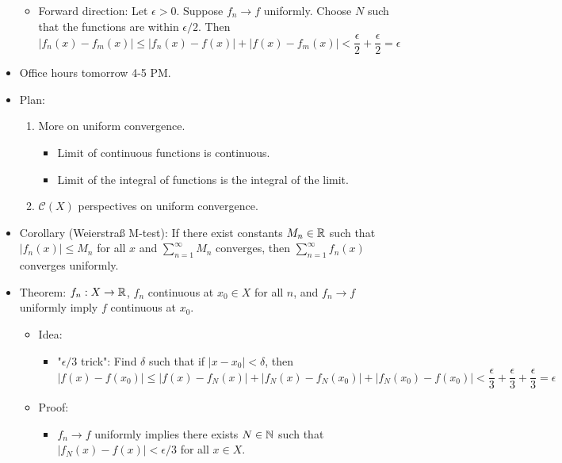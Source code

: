 \documentclass[../notes.tex]{subfiles}
\begin{document}
\begin{itemize}
    \begin{itemize}
        \item Forward direction: Let $\epsilon>0$. Suppose $f_n\to f$ uniformly. Choose $N$ such that the functions are within $\epsilon/2$. Then
        \begin{equation*}
            |f_n(x)-f_m(x)| \leq |f_n(x)-f(x)|+|f(x)-f_m(x)| < \frac{\epsilon}{2}+\frac{\epsilon}{2} = \epsilon
        \end{equation*}
    \end{itemize}
    \item {}Office hours tomorrow 4-5 PM.
    \item Plan:
    \begin{enumerate}
        \item More on uniform convergence.
        \begin{itemize}
            \item Limit of continuous functions is continuous.
            \item Limit of the integral of functions is the integral of the limit.
        \end{itemize}
        \item $\mathcal{C}(X)$ perspectives on uniform convergence.
    \end{enumerate}
    \item Corollary (Weierstra{\ss} M-test): If there exist constants $M_n\in\mathbb{R}$ such that $|f_n(x)|\leq M_n$ for all $x$ and $\sum_{n=1}^\infty M_n$ converges, then $\sum_{n=1}^\infty f_n(x)$ converges uniformly.
    \item Theorem: $f_n:X\to\mathbb{R}$, $f_n$ continuous at $x_0\in X$ for all $n$, and $f_n\to f$ uniformly imply $f$ continuous at $x_0$.
    \begin{itemize}
        \item Idea:
        \begin{itemize}
            \item "$\epsilon/3$ trick": Find $\delta$ such that if $|x-x_0|<\delta$, then
            \begin{equation*}
                |f(x)-f(x_0)| \leq |f(x)-f_N(x)|+|f_N(x)-f_N(x_0)|+|f_N(x_0)-f(x_0)| < \frac{\epsilon}{3}+\frac{\epsilon}{3}+\frac{\epsilon}{3} = \epsilon
            \end{equation*}
        \end{itemize}
        \item Proof:
        \begin{itemize}
            \item $f_n\to f$ uniformly implies there exists $N\in\mathbb{N}$ such that $|f_N(x)-f(x)|<\epsilon/3$ for all $x\in X$.

\end{itemize}
\end{itemize}
\end{itemize}
\end{document}
